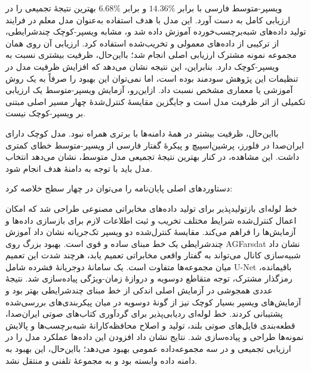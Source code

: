 
ویسپر-متوسط فارسی با  برابر $14.36\%$ و  برابر $6.68\%$ بهترین نتیجهٔ تجمیعی را در ارزیابی کامل به دست آورد. این مدل با هدف استفاده به‌عنوان مدل معلم در فرایند تولید داده‌های شبه‌برچسب‌خورده آموزش داده شد و، مشابه ویسپر-کوچک چندشرایطی، از ترکیبی از داده‌های معمولی و تخریب‌شده استفاده کرد. ارزیابی آن روی همان مجموعه نمونه مشترک ارزیابی اصلی انجام شد؛ بااین‌حال، ظرفیت بیشتری نسبت به ویسپر-کوچک دارد. بنابراین، این نتیجه نشان می‌دهد که افزایش ظرفیت مدل در تنظیمات این پژوهش سودمند بوده است، اما نمی‌توان این بهبود را صرفاً به یک روش آموزشی یا معماری مشخص نسبت داد. ازاین‌رو، آزمایش ویسپر-متوسط یک ارزیابی تکمیلی از اثر ظرفیت مدل است و جایگزین مقایسهٔ کنترل‌شدهٔ چهار مسیر اصلی مبتنی بر ویسپر-کوچک نیست.

بااین‌حال، ظرفیت بیشتر در همهٔ دامنه‌ها با برتری همراه نبود. مدل کوچک دارای ایران‌صدا در فلورز، پرشین‌اسپیچ و پیکرهٔ گفتار فارسی از ویسپر-متوسط خطای کمتری داشت. این مشاهده، در کنار بهترین نتیجهٔ تجمیعی مدل متوسط، نشان می‌دهد انتخاب مدل باید با توجه به دامنهٔ هدف انجام شود.


دستاوردهای اصلی پایان‌نامه را می‌توان در چهار سطح خلاصه کرد:

  خط لوله‌ای بازتولیدپذیر برای تولید داده‌های مخابراتی مصنوعی طراحی شد که امکان اعمال کنترل‌شده شرایط مختلف تخریب و ثبت اطلاعات لازم برای بازسازی داده‌ها و آزمایش‌ها را فراهم می‌کند.
  مقایسهٔ کنترل‌شده دو ویسپر تک‌جریانه نشان داد آموزش چندشرایطی یک خط مبنای ساده و قوی است. بهبود بزرگ روی AGFarsdat نشان داد شبیه‌سازی کانال می‌تواند به گفتار واقعی مخابراتی تعمیم یابد، هرچند شدت این تعمیم میان مجموعه‌ها متفاوت است.
  یک سامانهٔ دوجریانهٔ فشرده شامل U-Net باقیمانده، رمزگذار مشترک، توجه متقاطع دوسویه و دروازهٔ زمان-ویژگی پیاده‌سازی شد. نتیجهٔ عددی همجوشی در آزمایش اصلی اندکی از خط مبنای چندشرایطی بهتر بود و آزمایش‌های ویسپر بسیار کوچک نیز از گونهٔ دوسویه در میان پیکربندی‌های بررسی‌شده پشتیبانی کردند.
  خط لوله‌ای ردیابی‌پذیر برای گردآوری کتاب‌های صوتی ایران‌صدا، قطعه‌بندی فایل‌های صوتی بلند، تولید و اصلاح محافظه‌کارانهٔ شبه‌برچسب‌ها و پالایش نمونه‌ها طراحی و پیاده‌سازی شد. نتایج نشان داد افزودن این داده‌ها عملکرد مدل را در ارزیابی تجمیعی و در سه مجموعه‌داده عمومی بهبود می‌دهد؛ بااین‌حال، این بهبود به دامنه داده وابسته بود و به مجموعهٔ تلفنی و   منتقل نشد.

